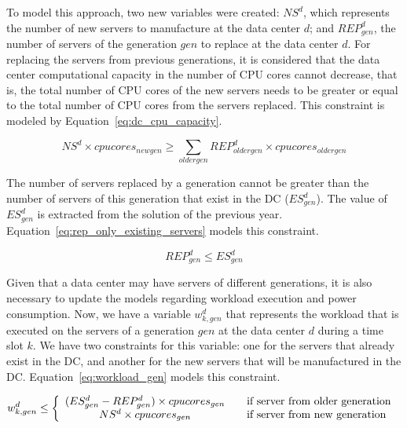 To model this approach, two new variables were created: $NS^d$, which represents the number of new servers to manufacture at the data center $d$; and $REP_{gen}^d$, the number of servers of the generation $gen$ to replace at the data center $d$. For replacing the servers from previous generations, it is considered that the data center computational capacity in the number of CPU cores cannot decrease, that is, the total number of CPU cores of the new servers needs to be greater or equal to the total number of CPU cores from the servers replaced. This constraint is modeled by Equation~\eqref{eq:dc_cpu_capacity}.

\begin{equation} \label{eq:dc_cpu_capacity}
 NS^d \times cpucores_{newgen} \geq \sum_{oldergen}  REP_{oldergen}^d \times cpucores_{oldergen}
\end{equation}

The number of servers replaced by a generation cannot be greater than the number of servers of this generation that exist in the DC ($ES_{gen}^d $). The value of  $ES_{gen}^d $ is extracted from the solution of the previous year. Equation~\eqref{eq:rep_only_existing_servers} models this constraint.

\begin{equation} \label{eq:rep_only_existing_servers}
 REP_{gen}^d \leq ES_{gen}^d 
\end{equation}


Given that a data center may have servers of different generations, it is also necessary to update the models regarding workload execution and power consumption. Now, we have a variable $w_{k,gen}^d$ that represents the workload that is executed on the servers of a generation $gen$ at the data center $d$ during a time slot $k$. We have two constraints for this variable: one for the servers that already exist in the DC, and another for the new servers that will be manufactured in the DC. Equation~\eqref{eq:workload_gen} models this constraint.


\begin{equation} \label{eq:workload_gen}
w_{k,gen}^d \leq   \left\{ 
  \begin{array}{ c l }
    (ES_{gen}^d - REP_{gen}^d) \times cpucores_{gen}  & \quad \textrm{if server from older generation  }     \\
     NS^d \times cpucores_{gen}   & \quad \textrm{if server from new generation  }      \\
    
  \end{array}
\right.
\end{equation}

